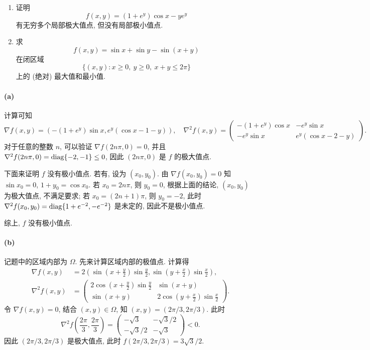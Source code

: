 \documentclass{article}
\begin{document}
\begin{problem}
  \begin{enumerate}
    \item[(a)] 证明
      \[
        f(x,y)=(1+e^y)\cos x-ye^y
      \]
      有无穷多个局部极大值点, 但没有局部极小值点.
    \item[(b)] 求
      \[
        f(x,y)=\sin x+\sin y-\sin(x+y)
      \]
      在闭区域
      \[
        \{(x,y):x\geq0,\ y\geq0,\ x+y\leq2\pi\}
      \]
      上的 (绝对) 最大值和最小值.
  \end{enumerate}
\end{problem}

\begin{solution}
	\paragraph{(a)} 计算可知
	\[ \nabla f(x,y) = \left( -(1+e^y) \sin x, e^y (\cos x - 1 - y) \right), \quad 
	\nabla^2 f(x,y) = \begin{pmatrix}
		-(1+e^y) \cos x & -e^y \sin x \\
		-e^y \sin x & e^y (\cos x - 2 - y)
	\end{pmatrix}. \]
	对于任意的整数 $n$, 可以验证 $\nabla f(2n \pi ,0) = 0$, 并且 $\nabla^2 f(2n \pi, 0) = \operatorname{diag}\{-2, -1\} \le 0$, 因此 $(2n \pi, 0)$ 是 $f$ 的极大值点. 

	下面来证明 $f$ 没有极小值点. 若有, 设为 $(x_0, y_0)$. 由 $\nabla f(x_0,y_0) = 0$ 知 $\sin x_0 = 0$, $1+y_0 = \cos x_0$. 若 $x_0 = 2n \pi$, 则 $y_0 = 0$, 根据上面的结论, $(x_0, y_0)$ 为极大值点, 不满足要求; 若 $x_0 = (2n+1) \pi$, 则 $y_0 = -2$, 此时 $\nabla^2 f(x_0, y_0) = \operatorname{diag}\{1+e^{-2}, -e^{-2}	\}$ 是未定的, 因此不是极小值点.

	综上, $f$ 没有极小值点.

	\paragraph{(b)} 记题中的区域内部为 $\Omega$. 先来计算区域内部的极值点. 计算得
	\begin{align*}
		\nabla f(x,y)
		&= 2\left( \sin\left( x+\frac{y}{2} \right) \sin \frac{y}{2}, 
		\sin \left( y + \frac{x}{2} \right) \sin \frac{x}{2} \right), \\
		\nabla^2 f(x,y)
		&= \begin{pmatrix}
			2\cos\left( x+\frac{y}{2} \right) \sin \frac{y}{2} & \sin(x+y) \\
			\sin (x+y) & 2\cos \left( y+\frac{x}{2} \right) \sin \frac{x}{2}
		\end{pmatrix}.
	\end{align*}
	令 $\nabla f(x,y) = 0$, 结合 $(x,y) \in \Omega$, 知 $(x,y) = (2\pi/3, 2\pi/3)$. 此时
	\[ \nabla^2 f\left( \frac{2\pi}{3}, \frac{2\pi}{3} \right) = 
	\begin{pmatrix}
		-\sqrt{3} & -\sqrt{3}/2 \\
		-\sqrt{3}/2 & -\sqrt{3}
	\end{pmatrix} < 0. \]
	因此 $(2\pi/3 ,2\pi/3)$ 是极大值点, 此时 $f(2\pi/3, 2\pi/3) = 3\sqrt{3}/2$.


\end{solution}
\end{document}
